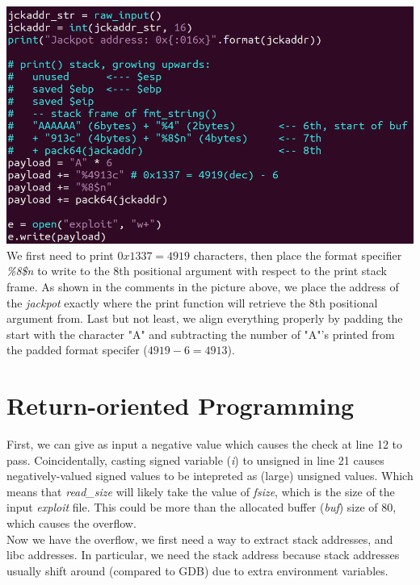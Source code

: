 \documentclass[12pt]{article}
\begin{document}
\includegraphics[scale=0.7]{./a2/format_string/script.PNG}\\

We first need to print $0x1337 = 4919$ characters, then place the format specifier \emph{\%8\$n} to write to the 8th positional argument with respect to the print stack frame.
As shown in the comments in the picture above, we place the address of the \emph{jackpot} exactly where the print function will retrieve the 8th positional argument from.
Last but not least, we align everything properly by padding the start with the character "A" and subtracting the number of "A"'s printed from the padded format specifer ($4919 - 6 = 4913$).



\newpage
\section{Return-oriented Programming}

First, we can give as input a negative value which causes the check at line 12 to pass.
Coincidentally, casting signed variable (\emph{i}) to unsigned in line 21 causes negatively-valued signed values to be intepreted as (large) unsigned values.
Which means that \emph{read\_size} will likely take the value of \emph{fsize}, which is the size of the input \emph{exploit} file.
This could be more than the allocated buffer (\emph{buf}) size of $80$, which causes the overflow.\\

Now we have the overflow, we first need a way to extract stack addresses, and libc addresses. In particular, we need the stack address because stack addresses usually shift around (compared to GDB) due to extra environment variables.\\
\end{document}
